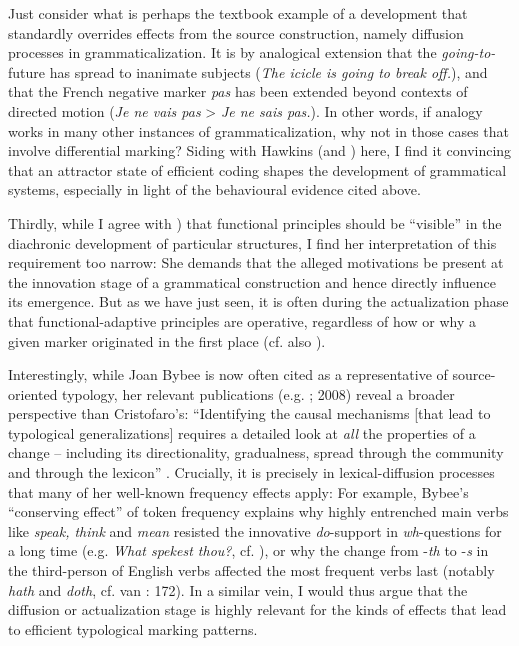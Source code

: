 \documentclass[output=paper]{langsci/langscibook}
\begin{document}
Just consider what is perhaps the textbook example of a development that standardly overrides effects from the source construction, namely diffusion processes in grammaticalization. It is by analogical extension that the \textit{going-to-}future has spread to inanimate subjects (\textit{The icicle is going to break off.}), and that the French negative marker \textit{pas} has been extended beyond contexts of directed motion (\textit{Je ne vais pas} > \textit{Je ne sais pas.}). In other words, if analogy works in many other instances of grammaticalization, why not in those cases that involve differential marking? Siding with Hawkins (and \citealt{Haspelmath2019tv}) here, I find it convincing that an attractor state of efficient coding shapes the development of grammatical systems, especially in light of the behavioural evidence cited above.

Thirdly, while I agree with \citet{Cristofaro2019tv}) that functional principles should be “visible” in the diachronic development of particular structures, I find her interpretation of this requirement too narrow: She demands that the alleged motivations be present at the innovation stage of a grammatical construction and hence directly influence its emergence. But as we have just seen, it is often during the actualization phase that functional-adaptive principles are operative, regardless of how or why a given marker originated in the first place (cf. also \citealt{Seržant2019tv}). 

Interestingly, while Joan Bybee is now often cited as a representative of source-oriented typology, her relevant publications (e.g. \citealt{Bybee1988}; 2008) reveal a broader perspective than Cristofaro’s: “Identifying the causal mechanisms [that lead to typological generalizations] requires a detailed look at \textit{all} the properties of a change – including its directionality, gradualness, spread through the community and through the lexicon” \citep[108]{Bybee2008}. Crucially, it is precisely in lexical-diffusion processes that many of her well-known frequency effects apply: For example, Bybee’s “conserving effect” of token frequency explains why highly entrenched main verbs like \textit{speak, think} and \textit{mean} resisted the innovative \textit{do}{}-support in \textit{wh}{}-questions for a long time (e.g. \textit{What spekest thou?}, cf. \citealt{Ogura1993}), or why the change from -\textit{th} to -\textit{s} in the third-person of English verbs affected the most frequent verbs last (notably \textit{hath} and \textit{doth}, cf. van \citealt{Gelderen2014}: 172). In a similar vein, I would thus argue that the diffusion or actualization stage is highly relevant for the kinds of effects that lead to efficient typological marking patterns. 
\end{document}
